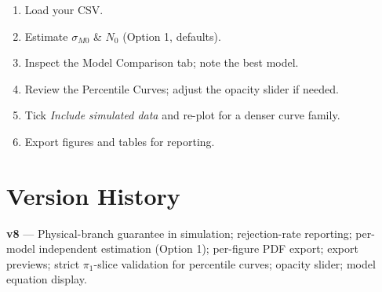 \documentclass[11pt,a4paper]{article}
\newcommand{\pio}{\ensuremath{\pi_1}}
\newcommand{\sMzero}{\ensuremath{\sigma_{M0}}}
\newcommand{\Nzero}{\ensuremath{N_0}}
\begin{document}
\begin{notebox}
\begin{enumerate}
  \item Load your CSV.
  \item Estimate $\sMzero$ \& $\Nzero$ (Option 1, defaults).
  \item Inspect the Model Comparison tab; note the best model.
  \item Review the Percentile Curves; adjust the opacity slider if needed.
  \item Tick \textit{Include simulated data} and re-plot for a denser curve family.
  \item Export figures and tables for reporting.
\end{enumerate}
\end{notebox}

\section*{Version History}

\textbf{v8} --- Physical-branch guarantee in simulation; rejection-rate reporting; per-model independent estimation (Option 1); per-figure PDF export; export previews; strict $\pio$-slice validation for percentile curves; opacity slider; model equation display.
\end{document}
